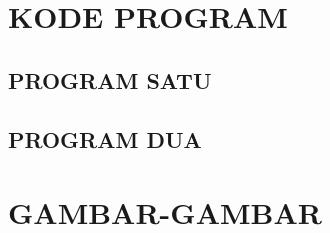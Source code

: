 \appendix

\chapter{KODE PROGRAM}

\section{PROGRAM SATU}
\section{PROGRAM DUA}


\chapter{GAMBAR-GAMBAR}

